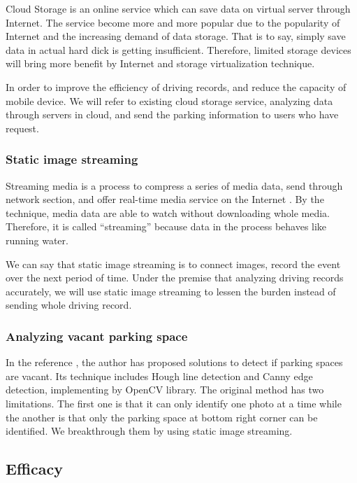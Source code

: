 \documentclass[runningheads,a4paper]{llncs}
\begin{document}
Cloud Storage is an online service which can save data on virtual server
through Internet. The service become more and more popular due to the
popularity of Internet and the increasing demand of data storage. That
is to say, simply save data in actual hard dick is getting insufficient.
Therefore, limited storage devices will bring more benefit by Internet
and storage virtualization technique.

In order to improve the efficiency of driving records, and reduce the
capacity of mobile device. We will refer to existing cloud storage
service, analyzing data through servers in cloud, and send the parking
information to users who have request.

%
\subsubsection{Static image streaming}
%

Streaming media is a process to compress a series of media data, send
through network section, and offer real-time media service on the
Internet \cite{IOV2014}. By the technique, media data are able to watch without
downloading whole media. Therefore, it is called ``streaming'' because
data in the process behaves like running water.

We can say that static image streaming is to connect images,
record the event over the next period of time. Under the premise that
analyzing driving records accurately, we will use static image streaming
to lessen the burden instead of sending whole driving record.

%
\subsubsection{Analyzing vacant parking space}
%

In the reference \cite{ParkingSpot}, the author has proposed solutions to detect if
parking spaces are vacant. Its technique includes Hough line detection
and Canny edge detection, implementing by OpenCV library. The
original method has two limitations. The first one is that it can only
identify one photo at a time while the another is that only the parking
space at bottom right corner can be identified. We breakthrough them by
using static image streaming.


%
\subsection{Efficacy}
%
\end{document}
